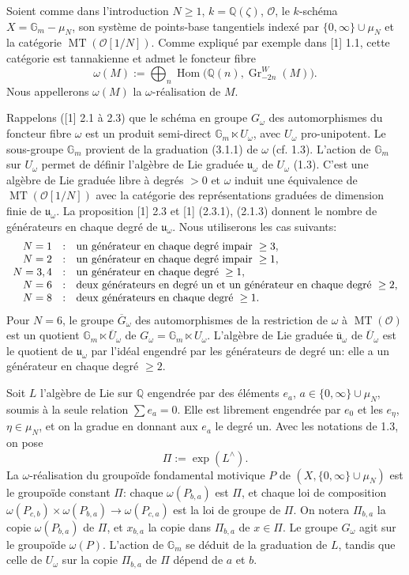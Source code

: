 \documentclass[10pt,a4paper]{article}
\newcommand{\Gm}{\mathbb G_m}
\newcommand{\muN}{\mu_N}
\newcommand{\Q}{\mathbb Q}
\newcommand{\Hom}{\operatorname{Hom}}
\newcommand{\MT}{\operatorname{MT}}
\newcommand{\Gr}{\operatorname{Gr}}
\newcommand{\OO}{\mathcal O}
\newcommand{\uomega}{\mathfrak u_\omega}
\newcommand{\barG}{\overline{G}_\omega}
\newcommand{\barU}{\overline{U}_\omega}
\newcommand{\baruomega}{\overline{\mathfrak u}_\omega}
\newcommand{\Lhat}{L^{\wedge}}
\theoremstyle{deligne}
\newcommand{\heading}[1]{\vspace{0.65em}\noindent{\bfseries #1}\quad}
\begin{document}
\heading{3.1.} Soient comme dans l'introduction \(N\ge1\), \(k=\Q(\zeta)\), \(\OO\), le \(k\)-schéma \(X=\Gm-\muN\), son système de points-base tangentiels indexé par \(\{0,\infty\}\cup\muN\) et la catégorie \(\MT(\OO[1/N])\). Comme expliqué par exemple dans [1] 1.1, cette catégorie est tannakienne et admet le foncteur fibre
\[
\tag{3.1.1}
\omega(M):=\bigoplus_n\Hom\bigl(\Q(n),\Gr^W_{-2n}(M)\bigr).
\]
Nous appellerons \(\omega(M)\) la \(\omega\)-réalisation de \(M\).

Rappelons ([1] 2.1 à 2.3) que le schéma en groupe \(G_\omega\) des automorphismes du foncteur fibre \(\omega\) est un produit semi-direct \(\Gm\ltimes U_\omega\), avec \(U_\omega\) pro-unipotent. Le sous-groupe \(\Gm\) provient de la graduation (3.1.1) de \(\omega\) (cf. 1.3). L'action de \(\Gm\) sur \(U_\omega\) permet de définir l'algèbre de Lie graduée \(\uomega\) de \(U_\omega\) (1.3). C'est une algèbre de Lie graduée libre à degrés \(>0\) et \(\omega\) induit une équivalence de \(\MT(\OO[1/N])\) avec la catégorie des représentations graduées de dimension finie de \(\uomega\). La proposition [1] 2.3 et [1] (2.3.1), (2.1.3) donnent le nombre de générateurs en chaque degré de \(\uomega\). Nous utiliserons les cas suivants:
\[
\begin{array}{rcl}
N=1&:&\hbox{un générateur en chaque degré impair }\ge3,\\
N=2&:&\hbox{un générateur en chaque degré impair }\ge1,\\
N=3,4&:&\hbox{un générateur en chaque degré }\ge1,\\
N=6&:&\hbox{deux générateurs en degré un et un générateur en chaque degré }\ge2,\\
N=8&:&\hbox{deux générateurs en chaque degré }\ge1.
\end{array}
\]
Pour \(N=6\), le groupe \(\barG\) des automorphismes de la restriction de \(\omega\) à \(\MT(\OO)\) est un quotient \(\Gm\ltimes\barU\) de \(G_\omega=\Gm\ltimes U_\omega\). L'algèbre de Lie graduée \(\baruomega\) de \(\barU\) est le quotient de \(\uomega\) par l'idéal engendré par les générateurs de degré un: elle a un générateur en chaque degré \(\ge2\).

\heading{3.2.} Soit \(L\) l'algèbre de Lie sur \(\Q\) engendrée par des éléments \(e_a\), \(a\in\{0,\infty\}\cup\muN\), soumis à la seule relation \(\sum e_a=0\). Elle est librement engendrée par \(e_0\) et les \(e_\eta\), \(\eta\in\muN\), et on la gradue en donnant aux \(e_a\) le degré un. Avec les notations de 1.3, on pose
\[
\Pi:=\exp(\Lhat).
\]
La \(\omega\)-réalisation du groupoïde fondamental motivique \(P\) de \((X,\{0,\infty\}\cup\muN)\) est le groupoïde constant \(\Pi\): chaque \(\omega(P_{b,a})\) est \(\Pi\), et chaque loi de composition \(\omega(P_{c,b})\times\omega(P_{b,a})\to\omega(P_{c,a})\) est la loi de groupe de \(\Pi\). On notera \(\Pi_{b,a}\) la copie \(\omega(P_{b,a})\) de \(\Pi\), et \(x_{b,a}\) la copie dans \(\Pi_{b,a}\) de \(x\in\Pi\). Le groupe \(G_\omega\) agit sur le groupoïde \(\omega(P)\). L'action de \(\Gm\) se déduit de la graduation de \(L\), tandis que celle de \(U_\omega\) sur la copie \(\Pi_{b,a}\) de \(\Pi\) dépend de \(a\) et \(b\).
\end{document}
